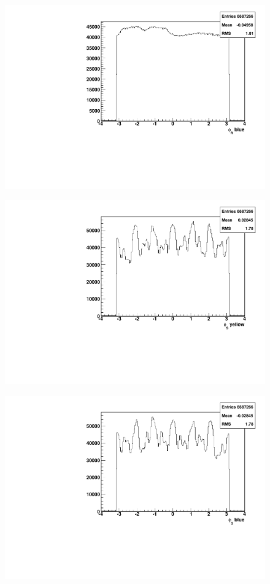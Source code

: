 \documentclass[abstract = on,listof=totoc, bibliography=totoc]{scrreprt}
\newcommand{\phir}{\phi_{R}}
\newcommand{\phis}{\phi_{S}}
\newcommand{\pip}{\pi^+}
\newcommand{\pim}{\pi^-}
\newcommand{\pair}{$\pip\pim$ }
\begin{document}
\begin{figure}
\begin{center}
\includegraphics[width = .8\textwidth]{hPhiRb}
\caption[$\phir$ distribution of \pair pair with reference to the blue beam polarization]{}
\label{fig:}
\end{center}
\end{figure}


\begin{figure}
\begin{center}
\includegraphics[width = .8\textwidth]{hPhiSy}
\caption[$\phis$ distribution of \pair pair with reference to the yellow beam polarization]{}
\label{fig:}
\end{center}
\end{figure}


\begin{figure}
\begin{center}
\includegraphics[width = .8\textwidth]{hPhiSb}
\caption[$\phis$ distribution of \pair pair with reference to the blue beam polarization]{}
\label{fig:}
\end{center}
\end{figure}
\end{document}
